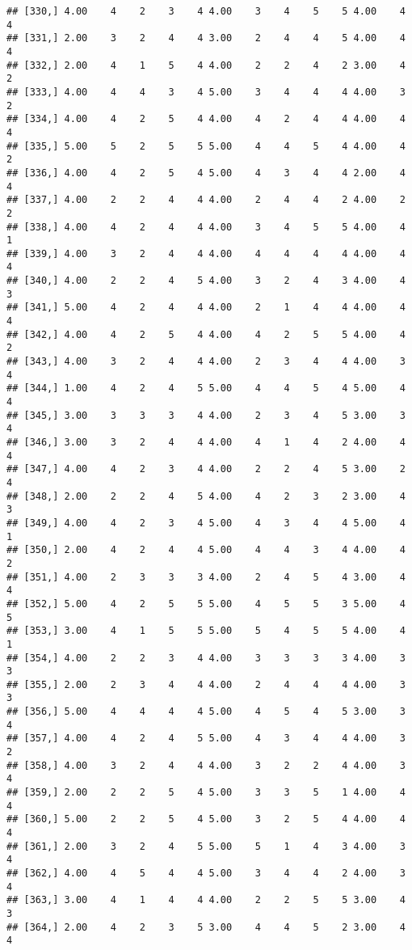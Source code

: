 \documentclass[]{article}
\begin{document}
\begin{verbatim}
## [330,] 4.00    4    2    3    4 4.00    3    4    5    5 4.00    4    4
## [331,] 2.00    3    2    4    4 3.00    2    4    4    5 4.00    4    4
## [332,] 2.00    4    1    5    4 4.00    2    2    4    2 3.00    4    2
## [333,] 4.00    4    4    3    4 5.00    3    4    4    4 4.00    3    2
## [334,] 4.00    4    2    5    4 4.00    4    2    4    4 4.00    4    4
## [335,] 5.00    5    2    5    5 5.00    4    4    5    4 4.00    4    2
## [336,] 4.00    4    2    5    4 5.00    4    3    4    4 2.00    4    4
## [337,] 4.00    2    2    4    4 4.00    2    4    4    2 4.00    2    2
## [338,] 4.00    4    2    4    4 4.00    3    4    5    5 4.00    4    1
## [339,] 4.00    3    2    4    4 4.00    4    4    4    4 4.00    4    4
## [340,] 4.00    2    2    4    5 4.00    3    2    4    3 4.00    4    3
## [341,] 5.00    4    2    4    4 4.00    2    1    4    4 4.00    4    4
## [342,] 4.00    4    2    5    4 4.00    4    2    5    5 4.00    4    2
## [343,] 4.00    3    2    4    4 4.00    2    3    4    4 4.00    3    4
## [344,] 1.00    4    2    4    5 5.00    4    4    5    4 5.00    4    4
## [345,] 3.00    3    3    3    4 4.00    2    3    4    5 3.00    3    4
## [346,] 3.00    3    2    4    4 4.00    4    1    4    2 4.00    4    4
## [347,] 4.00    4    2    3    4 4.00    2    2    4    5 3.00    2    4
## [348,] 2.00    2    2    4    5 4.00    4    2    3    2 3.00    4    3
## [349,] 4.00    4    2    3    4 5.00    4    3    4    4 5.00    4    1
## [350,] 2.00    4    2    4    4 5.00    4    4    3    4 4.00    4    2
## [351,] 4.00    2    3    3    3 4.00    2    4    5    4 3.00    4    4
## [352,] 5.00    4    2    5    5 5.00    4    5    5    3 5.00    4    5
## [353,] 3.00    4    1    5    5 5.00    5    4    5    5 4.00    4    1
## [354,] 4.00    2    2    3    4 4.00    3    3    3    3 4.00    3    3
## [355,] 2.00    2    3    4    4 4.00    2    4    4    4 4.00    3    3
## [356,] 5.00    4    4    4    4 5.00    4    5    4    5 3.00    3    4
## [357,] 4.00    4    2    4    5 5.00    4    3    4    4 4.00    3    2
## [358,] 4.00    3    2    4    4 4.00    3    2    2    4 4.00    3    4
## [359,] 2.00    2    2    5    4 5.00    3    3    5    1 4.00    4    4
## [360,] 5.00    2    2    5    4 5.00    3    2    5    4 4.00    4    4
## [361,] 2.00    3    2    4    5 5.00    5    1    4    3 4.00    3    4
## [362,] 4.00    4    5    4    4 5.00    3    4    4    2 4.00    3    4
## [363,] 3.00    4    1    4    4 4.00    2    2    5    5 3.00    4    3
## [364,] 2.00    4    2    3    5 3.00    4    4    5    2 3.00    4    4

\end{verbatim}
\end{document}
